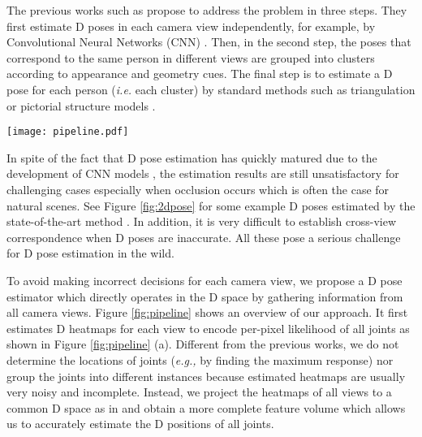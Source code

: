 \documentclass[runningheads]{llncs}
\def\ie{\emph{i.e.} }
\def\eg{\emph{e.g.,} }
\begin{document}
The previous works such as \cite{dong2019fast,bridgeman2019multi} propose to address the problem in three steps. They first estimate D poses in each camera view independently, for example, by Convolutional Neural Networks (CNN) \cite{cao2017realtime,he2017mask}. Then, in the second step, the poses that correspond to the same person in different views are grouped into clusters according to appearance and geometry cues. The final step is to estimate a D pose for each person (\ie each cluster) by standard methods such as triangulation \cite{hartley2003multiple} or pictorial structure models \cite{amin2013multi}. 

\begin{figure*}
	\centering
	\texttt{[image: pipeline.pdf]}
	\caption{Overview of our approach. It consists of three modules: (a) we first estimate D pose heatmaps for all views; (b) we warp the heatmaps to a common D space and construct a feature volume which is fed into a Cuboid Proposal Network to localize all people instances; (c) for each proposal, we construct a finer-grained feature volume and estimate a D pose.
	}
	\label{fig:pipeline}
\end{figure*}

In spite of the fact that D pose estimation has quickly matured due to the development of CNN models \cite{newell2016stacked,sun2019deep}, the estimation results are still unsatisfactory for challenging cases especially when occlusion occurs which is often the case for natural scenes. See Figure \ref{fig:2dpose} for some example D poses estimated by the state-of-the-art method \cite{sun2019deep}. In addition, it is very difficult to establish cross-view correspondence when D poses are inaccurate. All these pose a serious challenge for D pose estimation in the wild.



To avoid making incorrect decisions for each camera view, we propose a D pose estimator which directly operates in the D space by gathering information from all camera views. Figure \ref{fig:pipeline} shows an overview of our approach. It first estimates D heatmaps for each view to encode per-pixel likelihood of all joints as shown in Figure \ref{fig:pipeline} (a). Different from the previous works, we do not determine the locations of joints (\eg by finding the maximum response) nor group the joints into different instances because estimated heatmaps are usually very noisy and incomplete. Instead, we project the heatmaps of all views to a common D space as in \cite{qiu2019cross} and obtain a more complete feature volume which allows us to accurately estimate the D positions of all joints. 
\end{document}
